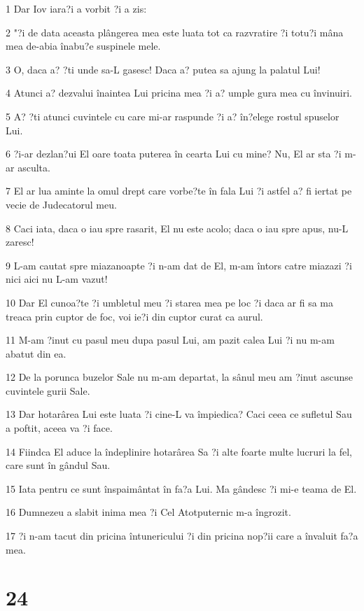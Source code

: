 \par 1 Dar Iov iara?i a vorbit ?i a zis:
\par 2 "?i de data aceasta plângerea mea este luata tot ca razvratire ?i totu?i mâna mea de-abia înabu?e suspinele mele.
\par 3 O, daca a? ?ti unde sa-L gasesc! Daca a? putea sa ajung la palatul Lui!
\par 4 Atunci a? dezvalui înaintea Lui pricina mea ?i a? umple gura mea cu învinuiri.
\par 5 A? ?ti atunci cuvintele cu care mi-ar raspunde ?i a? în?elege rostul spuselor Lui.
\par 6 ?i-ar dezlan?ui El oare toata puterea în cearta Lui cu mine? Nu, El ar sta ?i m-ar asculta.
\par 7 El ar lua aminte la omul drept care vorbe?te în fala Lui ?i astfel a? fi iertat pe vecie de Judecatorul meu.
\par 8 Caci iata, daca o iau spre rasarit, El nu este acolo; daca o iau spre apus, nu-L zaresc!
\par 9 L-am cautat spre miazanoapte ?i n-am dat de El, m-am întors catre miazazi ?i nici aici nu L-am vazut!
\par 10 Dar El cunoa?te ?i umbletul meu ?i starea mea pe loc ?i daca ar fi sa ma treaca prin cuptor de foc, voi ie?i din cuptor curat ca aurul.
\par 11 M-am ?inut cu pasul meu dupa pasul Lui, am pazit calea Lui ?i nu m-am abatut din ea.
\par 12 De la porunca buzelor Sale nu m-am departat, la sânul meu am ?inut ascunse cuvintele gurii Sale.
\par 13 Dar hotarârea Lui este luata ?i cine-L va împiedica? Caci ceea ce sufletul Sau a poftit, aceea va ?i face.
\par 14 Fiindca El aduce la îndeplinire hotarârea Sa ?i alte foarte multe lucruri la fel, care sunt în gândul Sau.
\par 15 Iata pentru ce sunt înspaimântat în fa?a Lui. Ma gândesc ?i mi-e teama de El.
\par 16 Dumnezeu a slabit inima mea ?i Cel Atotputernic m-a îngrozit.
\par 17 ?i n-am tacut din pricina întunericului ?i din pricina nop?ii care a învaluit fa?a mea.

\chapter{24}

